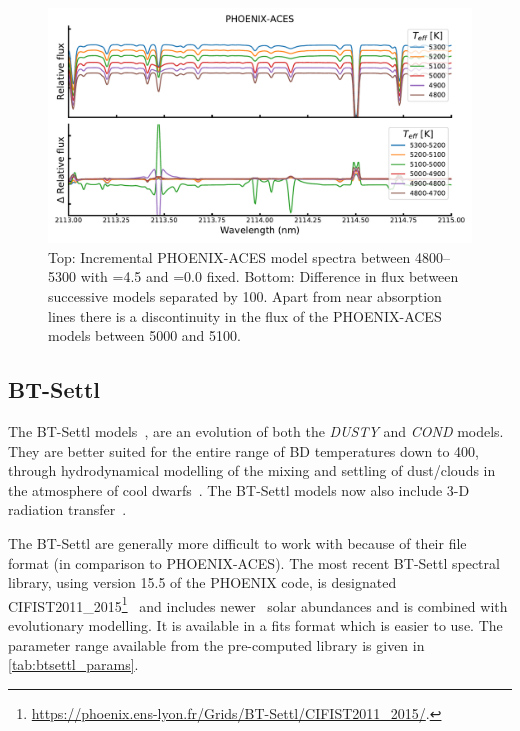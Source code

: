 \begin{figure}
    \centering
    \includegraphics[width=0.8\linewidth]{figures/atmos_and_models/phoenix_differece_at_5000K}
    \caption[Difference in successive {PHOENIX-ACES} spectra around 5000\K.]{Top: Incremental {PHOENIX-ACES} model spectra between 4800--5300\K{} with \Logg{}=4.5 and \feh{}=0.0 fixed.
    Bottom: Difference in flux between successive models separated by 100\K{}.
    Apart from near absorption lines there is a discontinuity in the flux of the {PHOENIX-ACES} models between 5000 and 5100\K{}.}
    \label{fig:phoenixdiffereceat5000k}
\end{figure}

\subsection{BT-Settl}
\label{subsec:btsettl}
The {BT-Settl} models~\citep{allard_models_2012,allard_atmospheres_2012,rajpurohit_effective_2013,baraffe_new_2015}, are an evolution of both the \emph{DUSTY} and \emph{COND} models.
They are better suited for the entire range of {BD} temperatures down to 400\K{}, through hydrodynamical modelling of the mixing and settling of dust/clouds in the atmosphere of cool dwarfs~\citep{freytag_role_2010}.
The {BT-Settl} models now also include 3-D radiation transfer~\citep{seelmann_3d_2010}.

The {BT-Settl} are generally more difficult to work with because of their file format (in comparison to {PHOENIX-ACES}).
The most recent {BT-Settl} spectral library, using version 15.5 of the {PHOENIX} code, is designated {CIFIST2011\_2015}\footnote{\href{https://phoenix.ens-lyon.fr/Grids/BT-Settl/CIFIST2011_2015/}{\url{https://phoenix.ens-lyon.fr/Grids/BT-Settl/CIFIST2011_2015/}}.}~\citep{baraffe_new_2015} and includes newer~\citet{caffau_solar_2011} solar abundances and is combined with evolutionary modelling.
It is available in a fits format which is easier to use.
The parameter range available from the pre-computed library is given in \cref{tab:btsettl_params}.


